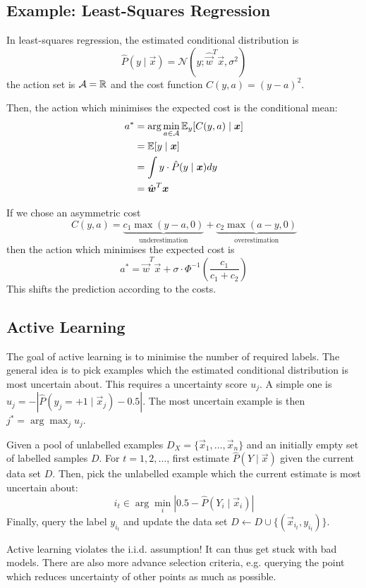 \subsection{Example: Least-Squares Regression}
In least-squares regression,
the estimated conditional distribution is
\begin{equation*}
    \hat{P}(y \mid \vec{x}) =
    \mathcal{N}(y ; \hat{\vec{w}}^T \vec{x}, \sigma^2)
\end{equation*}
the action set is
$\mathcal{A} = \mathbb{R}$ and
the cost function
$C(y, a) = (y - a)^2$.

Then, the action which minimises the
expected cost is the conditional mean:
\begin{align*}
    a^* &=
    \arg\min_{a \in \mathcal{A}}{
        \mathbb{E}_y[C(y, a) \mid \boldsymbol{x}]
    } \\
    &= \mathbb{E}[y \mid \boldsymbol{x}] \\
    &= \int{y \cdot \hat{P}(y \mid \boldsymbol{x}) dy} \\
    &= \hat{\boldsymbol{w}}^T \boldsymbol{x}
\end{align*}

If we chose an asymmetric cost
\begin{equation*}
    C(y, a) =
    \underbrace{c_1 \max{(y - a, 0)}}_\text{underestimation}
    +
    \underbrace{c_2 \max{(a - y, 0)}}_\text{overestimation}
\end{equation*}
then the action which minimises the
expected cost is
\begin{equation*}
    a^* = \hat{\vec{w}}^T \vec{x}
    + \sigma \cdot \Phi^{-1}\left(
    \frac{c_1}{c_1 + c_2}
    \right)
\end{equation*}
This shifts the prediction according
to the costs.


\subsection{Active Learning}
The goal of active learning is to minimise
the number of required labels.
The general idea is to pick examples
which the estimated conditional distribution
is most uncertain about.
This requires a uncertainty score $u_j$.
A simple one is
$u_j = -|\hat{P}(y_j = +1 \mid \vec{x}_j) - 0.5|$.
The most uncertain example is then
$j^* = \arg\max_j{u_j}$.

Given a pool of unlabelled examples
$D_X = \{\vec{x}_1, \dotsc, \vec{x}_n\}$
and an initially empty set of labelled
samples $D$.
For $t = 1, 2, \dotsc$, first
estimate $\hat{P}(Y \mid \vec{x})$
given the current data set $D$.
Then, pick the unlabelled example which
the current estimate is most uncertain
about:
\begin{equation*}
    i_t \in \arg\min_i{
        |0.5 - \hat{P}(Y_i \mid \vec{x}_i)|
    }
\end{equation*}
Finally, query the label $y_{i_t}$
and update the data set
$D \gets D \cup \{(\vec{x}_{i_t}, y_{i_t})\}$.

Active learning violates the i.i.d.
assumption!
It can thus get stuck with bad models.
There are also more advance selection
criteria,
e.g. querying the point which reduces
uncertainty of other points as much
as possible.
